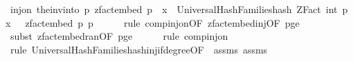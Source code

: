 \begin{isabellebody}
\ {\isachardoublequoteopen}inj{\isacharunderscore}{\kern0pt}on\ {\isacharparenleft}{\kern0pt}the{\isacharunderscore}{\kern0pt}inv{\isacharunderscore}{\kern0pt}into\ {\isacharbraceleft}{\kern0pt}{}{\isachardot}{\kern0pt}{\isachardot}{\kern0pt}{\isacharless}{\kern0pt}p{\isacharbraceright}{\kern0pt}\ {\isacharparenleft}{\kern0pt}zfact{\isacharunderscore}{\kern0pt}embed\ p{\isacharparenright}{\kern0pt}\ {\isasymcirc}\ {\isacharparenleft}{\kern0pt}{\isasymlambda}x{\isachardot}{\kern0pt}\ \ {\isacharparenleft}{\kern0pt}Universal{\isacharunderscore}{\kern0pt}Hash{\isacharunderscore}{\kern0pt}Families{\isachardot}{\kern0pt}hash\ {\isacharparenleft}{\kern0pt}ZFact\ {\isacharparenleft}{\kern0pt}int\ p{\isacharparenright}{\kern0pt}{\isacharparenright}{\kern0pt}\ x\ {\isasymomega}{\isacharparenright}{\kern0pt}{\isacharparenright}{\kern0pt}\ {\isasymcirc}\ {\isacharparenleft}{\kern0pt}zfact{\isacharunderscore}{\kern0pt}embed\ p{\isacharparenright}{\kern0pt}{\isacharparenright}{\kern0pt}\ {\isacharbraceleft}{\kern0pt}{}{\isachardot}{\kern0pt}{\isachardot}{\kern0pt}{\isacharless}{\kern0pt}p{\isacharbraceright}{\kern0pt}{\isachardoublequoteclose}\isanewline
\ \ \ \ \isamarkupfalse%
\ {\isacharparenleft}{\kern0pt}rule\ comp{\isacharunderscore}{\kern0pt}inj{\isacharunderscore}{\kern0pt}on{\isacharbrackleft}{\kern0pt}OF\ zfact{\isacharunderscore}{\kern0pt}embed{\isacharunderscore}{\kern0pt}inj{\isacharbrackleft}{\kern0pt}OF\ p{\isacharunderscore}{\kern0pt}ge{\isacharunderscore}{\kern0pt}{}{\isacharbrackright}{\kern0pt}{\isacharbrackright}{\kern0pt}{\isacharparenright}{\kern0pt}\isanewline
\ \ \ \ \isamarkupfalse%
\ {\isacharparenleft}{\kern0pt}subst\ zfact{\isacharunderscore}{\kern0pt}embed{\isacharunderscore}{\kern0pt}ran{\isacharbrackleft}{\kern0pt}OF\ p{\isacharunderscore}{\kern0pt}ge{\isacharunderscore}{\kern0pt}{}{\isacharbrackright}{\kern0pt}{\isacharparenright}{\kern0pt}\isanewline
\ \ \ \ \isamarkupfalse%
\ {\isacharparenleft}{\kern0pt}rule\ comp{\isacharunderscore}{\kern0pt}inj{\isacharunderscore}{\kern0pt}on{\isacharparenright}{\kern0pt}\isanewline
\ \ \ \ \ \isamarkupfalse%
\ {\isacharparenleft}{\kern0pt}rule\ Universal{\isacharunderscore}{\kern0pt}Hash{\isacharunderscore}{\kern0pt}Families{\isachardot}{\kern0pt}hash{\isacharunderscore}{\kern0pt}inj{\isacharunderscore}{\kern0pt}if{\isacharunderscore}{\kern0pt}degree{\isacharunderscore}{\kern0pt}{}{\isacharbrackleft}{\kern0pt}OF\ {\isacharunderscore}{\kern0pt}\ assms{\isacharparenleft}{\kern0pt}{}{\isacharparenright}{\kern0pt}\ assms{\isacharparenleft}{\kern0pt}{}{\isacharparenright}{\kern0pt}{\isacharbrackright}{\kern0pt}{\isacharparenright}{\kern0pt}\isanewline

\end{isabellebody}
